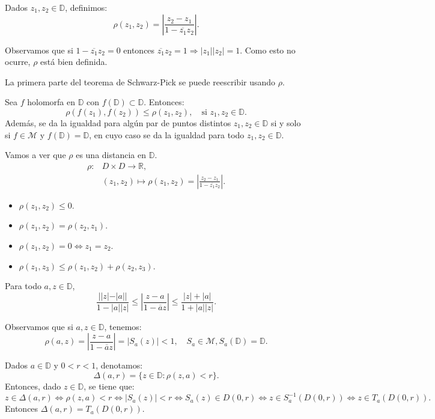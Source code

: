 \begin{definition}
    Dados $z_1, z_2 \in \mathbb{D}$, definimos:
    $$\rho(z_1, z_2) = \left|\frac{z_2-z_1}{1-\overline{z_1}z_2}\right|.$$

    Observamos que si $1-\overline{z_1}z_2 = 0$ entonces $\overline{z_1}z_2 = 1 \Rightarrow |z_1||z_2| = 1$.
    Como esto no ocurre, $\rho$ está bien definida.
\end{definition}

La primera parte del teorema de Schwarz-Pick se puede reescribir usando $\rho$.

Sea $f$ holomorfa en $\mathbb{D}$ con $f(\mathbb{D}) \subset \mathbb{D}$.
Entonces:
$$\rho(f(z_1), f(z_2)) \leq \rho(z_1, z_2), \quad \text{si } z_1, z_2 \in \mathbb{D}.$$
Además, se da la igualdad para algún par de puntos distintos $z_1, z_2 \in \mathbb{D}$ si y solo si $f \in \mathcal{M}$ y $f(\mathbb{D}) = \mathbb{D}$, en cuyo caso se da la igualdad para todo $z_1, z_2 \in \mathbb{D}$.

Vamos a ver que $\rho$ es una distancia en $\mathbb{D}$.
\begin{align*}
    \rho: & D \times D \to \mathbb{R},                                                            \\
          & (z_1, z_2) \mapsto \rho(z_1, z_2) = \left|\frac{z_2-z_1}{1-\overline{z_1}z_2}\right|.
\end{align*}

\begin{itemize}
    \item $\rho(z_1, z_2) \leq 0$.
    \item $\rho(z_1, z_2) = \rho(z_2, z_1)$.
    \item $\rho(z_1, z_2) = 0 \Leftrightarrow z_1 = z_2$.
    \item $\rho(z_1, z_3) \leq \rho(z_1, z_2) + \rho(z_2, z_3)$.
\end{itemize}

\begin{lemma}
    Para todo $a, z \in \mathbb{D}$,
    $$\frac{||z|-|a||}{1-|a||z|} \leq \left|\frac{z-a}{1-\overline{a}z}\right| \leq \frac{|z|+|a|}{1+|a||z|}.$$
\end{lemma}

Observamos que si $a, z \in \mathbb{D}$, tenemos:
$$\rho(a, z) = \left|\frac{z-a}{1-\overline{a}z}\right| = |S_a(z)| < 1, \quad S_a \in \mathcal{M}, S_a(\mathbb{D}) = \mathbb{D}.$$

Dados $a \in \mathbb{D}$ y $0 < r < 1$, denotamos:
$$\Delta(a, r) = \{z \in \mathbb{D} : \rho(z, a) < r\}.$$
Entonces, dado $z \in \mathbb{D}$, se tiene que:
$$z \in \Delta(a, r) \Leftrightarrow \rho(z, a) < r \Leftrightarrow |S_a(z)| < r \Leftrightarrow S_a(z) \in D(0, r) \Leftrightarrow z \in S_a^{-1}(D(0, r)) \Leftrightarrow z \in T_a(D(0, r)).$$
Entonces $\Delta(a, r) = T_a(D(0, r))$.

